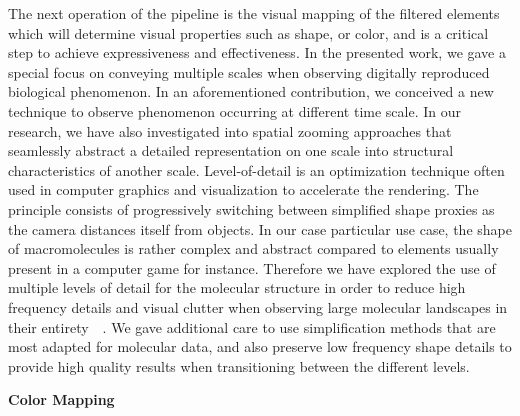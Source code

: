 The next operation of the pipeline is the visual mapping of the filtered elements which will determine visual properties such as shape, or color, and is a critical step to achieve expressiveness and effectiveness.
In the presented work, we gave a special focus on conveying multiple scales when observing digitally reproduced biological phenomenon. 
In an aforementioned contribution, we conceived a new technique to observe phenomenon occurring at different time scale.
In our research, we have also investigated into spatial zooming approaches that seamlessly abstract a detailed representation on one scale into structural characteristics of another scale.
Level-of-detail is an optimization technique often used in computer graphics and visualization to accelerate the rendering.
The principle consists of progressively switching between simplified shape proxies as the camera distances itself from objects.
In our case particular use case, the shape of macromolecules is rather complex and abstract compared to elements usually present in a computer game for instance.
Therefore we have explored the use of multiple levels of detail for the molecular structure in order to reduce high frequency details and visual clutter when observing large molecular landscapes in their entirety~\cite{cellView}~\cite{le2014illustrative}. 
We gave additional care to use simplification methods that are most adapted for molecular data, and also preserve low frequency shape details to provide high quality results when transitioning between the different levels.


\textbf{Color Mapping}

